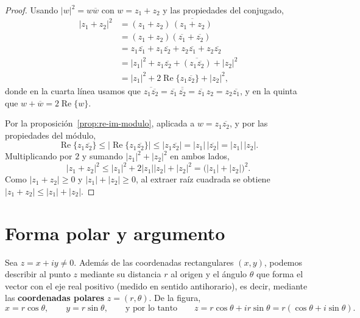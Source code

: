 \documentclass[12pt,a4paper]{book}
\DeclareMathOperator{\Real}{Re}
\begin{document}
  \begin{proof}
    Usando $|w|^2=w\overline{w}$ con $w=z_1+z_2$ y las propiedades del conjugado,
    \begin{align*}
      |z_1+z_2|^2 & = (z_1+z_2)\,\overline{(z_1+z_2)}                                                                     \\
                  & = (z_1+z_2)(\overline{z_1}+\overline{z_2})                                                            \\
                  & = z_1\overline{z_1}+z_1\overline{z_2}+z_2\overline{z_1}+z_2\overline{z_2}                             \\
                  & = |z_1|^2+z_1\overline{z_2}+\overline{\left(z_1\overline{z_2}\right)}+|z_2|^2                          \\
                  & = |z_1|^2+2\Real\{z_1\overline{z_2}\}+|z_2|^2,
    \end{align*}
    donde en la cuarta línea usamos que $\overline{z_1\overline{z_2}}=\overline{z_1}\,\overline{\overline{z_2}}=\overline{z_1}\,z_2=z_2\overline{z_1}$, y en la quinta que $w+\overline{w}=2\Real\{w\}$.

    Por la proposición~\ref{prop:re-im-modulo}, aplicada a $w=z_1\overline{z_2}$, y por las propiedades del módulo,
    \begin{equation*}
      \Real\{z_1\overline{z_2}\}\leq|\Real\{z_1\overline{z_2}\}|\leq|z_1\overline{z_2}|=|z_1|\,|\overline{z_2}|=|z_1|\,|z_2|.
    \end{equation*}
    Multiplicando por $2$ y sumando $|z_1|^2+|z_2|^2$ en ambos lados,
    \begin{equation*}
      |z_1+z_2|^2\leq|z_1|^2+2|z_1||z_2|+|z_2|^2=\big(|z_1|+|z_2|\big)^2.
    \end{equation*}
    Como $|z_1+z_2|\geq 0$ y $|z_1|+|z_2|\geq 0$, al extraer raíz cuadrada se obtiene $|z_1+z_2|\leq|z_1|+|z_2|$.
  \end{proof}

  \section{Forma polar y argumento}

  Sea $z=x+iy\neq 0$. Además de las coordenadas rectangulares $(x,y)$, podemos describir al punto $z$ mediante su distancia $r$ al origen y el ángulo $\theta$ que forma el vector con el eje real positivo (medido en sentido antihorario), es decir, mediante las \textbf{coordenadas polares} $z=(r,\theta)$. De la figura,
  \begin{equation*}
    x=r\cos\theta, \qquad y=r\sin\theta, \qquad\text{y por lo tanto}\qquad z=r\cos\theta+ir\sin\theta=r(\cos\theta+i\sin\theta).
  \end{equation*}
\end{document}
